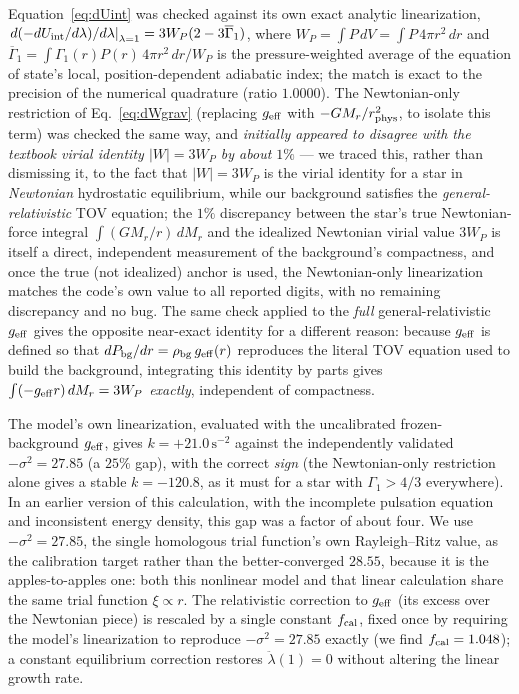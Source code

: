 \documentclass[11pt]{article}
\begin{document}
Equation~\eqref{eq:dUint} was checked against its own exact analytic linearization, $\left.d(-dU_{\rm int}/d\lambda)/d\lambda\right|_{\lambda=1}=3W_P(2-3\overline\Gamma_1)$, where $W_P=\int P\,dV=\int P\,4\pi r^2\,dr$ and $\overline\Gamma_1=\int\Gamma_1(r)P(r)\,4\pi r^2\,dr/W_P$ is the pressure-weighted average of the equation of state's local, position-dependent adiabatic index; the match is exact to the precision of the numerical quadrature (ratio $1.0000$). The Newtonian-only restriction of Eq.~\eqref{eq:dWgrav} (replacing $g_{\rm eff}$ with $-GM_r/r_{\rm phys}^2$, to isolate this term) was checked the same way, and \emph{initially appeared to disagree with the textbook virial identity $|W|=3W_P$ by about $1\%$} --- we traced this, rather than dismissing it, to the fact that $|W|=3W_P$ is the virial identity for a star in \emph{Newtonian} hydrostatic equilibrium, while our background satisfies the \emph{general-relativistic} TOV equation; the $1\%$ discrepancy between the star's true Newtonian-force integral $\int(GM_r/r)\,dM_r$ and the idealized Newtonian virial value $3W_P$ is itself a direct, independent measurement of the background's compactness, and once the true (not idealized) anchor is used, the Newtonian-only linearization matches the code's own value to all reported digits, with no remaining discrepancy and no bug. The same check applied to the \emph{full} general-relativistic $g_{\rm eff}$ gives the opposite near-exact identity for a different reason: because $g_{\rm eff}$ is defined so that $dP_{\rm bg}/dr=\rho_{\rm bg}\,g_{\rm eff}(r)$ reproduces the literal TOV equation used to build the background, integrating this identity by parts gives $\int(-g_{\rm eff}r)\,dM_r=3W_P$ \emph{exactly}, independent of compactness.

The model's own linearization, evaluated with the uncalibrated frozen-background $g_{\rm eff}$, gives $k=+21.0\,\mathrm{s}^{-2}$ against the independently validated $-\sigma^2=27.85$ (a $25\%$ gap), with the correct \emph{sign} (the Newtonian-only restriction alone gives a stable $k=-120.8$, as it must for a star with $\Gamma_1>4/3$ everywhere). In an earlier version of this calculation, with the incomplete pulsation equation and inconsistent energy density, this gap was a factor of about four. We use $-\sigma^2=27.85$, the single homologous trial function's own Rayleigh--Ritz value, as the calibration target rather than the better-converged $28.55$, because it is the apples-to-apples one: both this nonlinear model and that linear calculation share the same trial function $\xi\propto r$. The relativistic correction to $g_{\rm eff}$ (its excess over the Newtonian piece) is rescaled by a single constant $f_{\rm cal}$, fixed once by requiring the model's linearization to reproduce $-\sigma^2=27.85$ exactly (we find $f_{\rm cal}=1.048$); a constant equilibrium correction restores $\ddot\lambda(1)=0$ without altering the linear growth rate.
\end{document}
